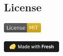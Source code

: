 \documentclass[
]{article}
\begin{document}
\hypertarget{license}{%
  \subsection{License}\label{license}}

\href{https://opensource.org/licenses/MIT}{\includegraphics[width=2cm]{./License MIT.png}}

\href{https://fresh.deno.dev}{\includegraphics[width=3cm]{./fresh-badge-dark.png}}

\end{document}

